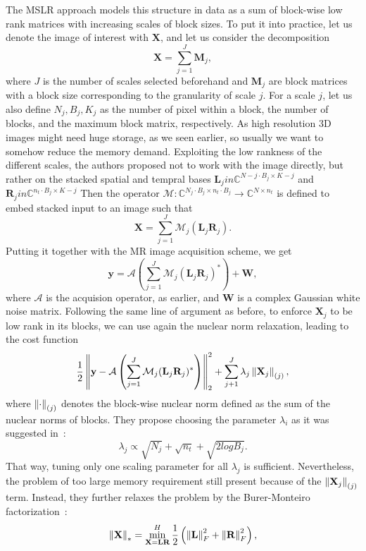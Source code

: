The MSLR approach models this structure in data as a sum of block-wise low rank matrices with increasing scales of block sizes. To put it into practice, let us denote the image of interest with $\mathbf{X}$, and let us consider the decomposition
\[\mathbf{X} = \sum_{j=1}^J \mathbf{M}_j,\]
where $J$ is the number of scales selected beforehand and $\mathbf{M}_j$ are block matrices with a block size corresponding to the granularity of scale $j$. For a scale $j$, let us also define $N_j, B_j, K_j$ as the number of pixel within a block, the number of blocks, and the maximum block matrix, respectively. As high resolution 3D images might need huge storage, as we seen earlier, so usually we want to somehow reduce the memory demand. Exploiting the low rankness of the different scales, the authors proposed not to work with the image directly, but rather on the stacked spatial and tempral bases $\mathbf{L}_j in \mathbb{C}^{N-j\cdot B_j\times K-j}$ and $\mathbf{R}_j in \mathbb{C}^{n_t\cdot B_j\times K-j}$ Then the operator $\mathcal{M}:\mathbb{C}^{N_j \cdot B_j \times n_t \cdot B_j} \rightarrow \mathbb{C}^{N \times n_t}$ is defined to embed stacked input to an image such that
\[\mathbf{X} = \sum_{j=1}^J \mathcal{M}_j(\mathbf{L}_j\mathbf{R}_j).\]
Putting it together with the MR image acquisition scheme, we get
\[\mathbf{y} = \mathcal{A}\left(\sum_{j=1}^J \mathcal{M}_j(\mathbf{L}_j\mathbf{R}_j)^*\right) + \mathbf{W},\]
where $\mathcal{A}$ is the acquision operator, as earlier, and $\mathbf{W}$ is a complex Gaussian white noise matrix. Following the same line of argument as before, to enforce $\mathbf{X}_j$ to be low rank in its blocks, we can use again the nuclear norm relaxation, leading to the cost function
\[\frac{1}{2}\left\lVert\mathbf{y} - \mathcal{A}\left(\sum_{j=1}^J \mathcal{M}_j(\mathbf{L}_j\mathbf{R}_j)^*\right)\right\rVert_2^2 + \sum_{j+1}^J \lambda_j \left\lVert\mathbf{X}_j\right\rVert_{(j)},\]
where $\left\lVert\cdot\right\rVert_{(j)}$ denotes the block-wise nuclear norm defined as the sum of the nuclear norms of blocks. They propose choosing the parameter $\lambda_i$ as it was suggested in~\cite{ong_beyond_2016}:
\[\lambda_j \propto \sqrt{N_j} + \sqrt{n_t} + \sqrt{2 log B_j}.\]
That way, tuning only one scaling parameter for all $\lambda_j$ is sufficient. Nevertheless, the problem of too large memory requirement still present because of the $\left\lVert\mathbf{X}_j\right\rVert_{(j)}$ term. Instead, they further relaxes the problem by the Burer-Monteiro factorization~\cite{burer_nonlinear_2003, recht_guaranteed_2010}:
\[\left\lVert\mathbf{X}\right\rVert_* = \min_\mathbf{X = LR}^H \frac{1}{2}\left(\left\lVert\mathbf{L}\right\rVert_F^2 + \left\lVert\mathbf{R}\right\rVert_F^2\right),\]
